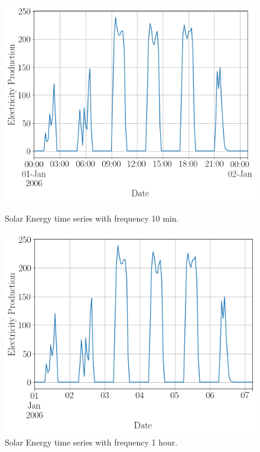 \begin{figure}[htb]
  \centering
  \includegraphics[width=\linewidth]{./img/solar_energy_10min_small.png}
  \caption{Solar Energy time series with frequency 10 min.}
  \label{fig:solar_10_min}
  \endminipage\hfill
  \includegraphics[width=\linewidth]{./img/solar_energy_fixed_small.png}
  \caption{Solar Energy time series with frequency 1 hour.}
  \label{fig:solar_fixed}
  \endminipage\hfill
\end{figure}

